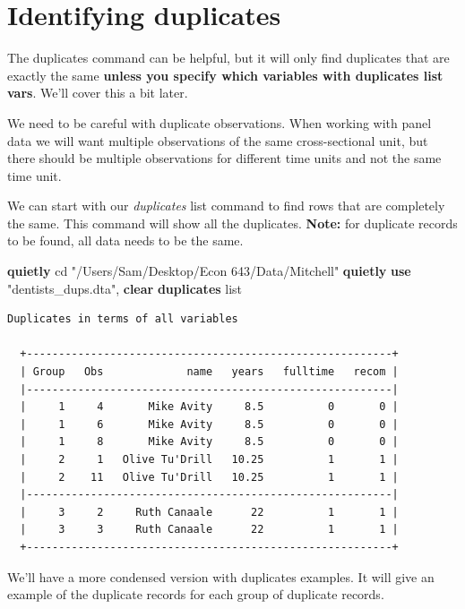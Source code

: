 \documentclass[
]{book}
\newenvironment{Shaded}{\begin{snugshade}}{\end{snugshade}}
\newcommand{\KeywordTok}[1]{\textcolor[rgb]{0.13,0.29,0.53}{\textbf{#1}}}
\newcommand{\NormalTok}[1]{#1}
\newcommand{\OtherTok}[1]{\textcolor[rgb]{0.56,0.35,0.01}{#1}}
\newcommand{\StringTok}[1]{\textcolor[rgb]{0.31,0.60,0.02}{#1}}
\begin{document}
\section{Identifying duplicates}\label{identifying-duplicates}

The duplicates command can be helpful, but it will only find duplicates that are exactly the same \textbf{unless you specify which variables with duplicates list vars}.
We'll cover this a bit later.

We need to be careful with duplicate observations. When working with panel data we will want multiple observations of the same cross-sectional unit, but there should be multiple observations for different time units and not the same time unit.

We can start with our \emph{duplicates} list command to find rows that are completely the same. This command will show all the duplicates. \textbf{Note:} for duplicate records to be found, all data needs to be the same.

\begin{Shaded}
\begin{Highlighting}[]
\KeywordTok{quietly}\NormalTok{ cd }\StringTok{"/Users/Sam/Desktop/Econ 643/Data/Mitchell"}
\KeywordTok{quietly} \KeywordTok{use} \StringTok{"dentists\_dups.dta"}\NormalTok{, }\KeywordTok{clear}
\KeywordTok{duplicates} \OtherTok{list}
\end{Highlighting}
\end{Shaded}

\begin{verbatim}
Duplicates in terms of all variables

  +---------------------------------------------------------+
  | Group   Obs             name   years   fulltime   recom |
  |---------------------------------------------------------|
  |     1     4       Mike Avity     8.5          0       0 |
  |     1     6       Mike Avity     8.5          0       0 |
  |     1     8       Mike Avity     8.5          0       0 |
  |     2     1   Olive Tu'Drill   10.25          1       1 |
  |     2    11   Olive Tu'Drill   10.25          1       1 |
  |---------------------------------------------------------|
  |     3     2     Ruth Canaale      22          1       1 |
  |     3     3     Ruth Canaale      22          1       1 |
  +---------------------------------------------------------+
\end{verbatim}

We'll have a more condensed version with duplicates examples. It will give an
example of the duplicate records for each group of duplicate records.
\end{document}
